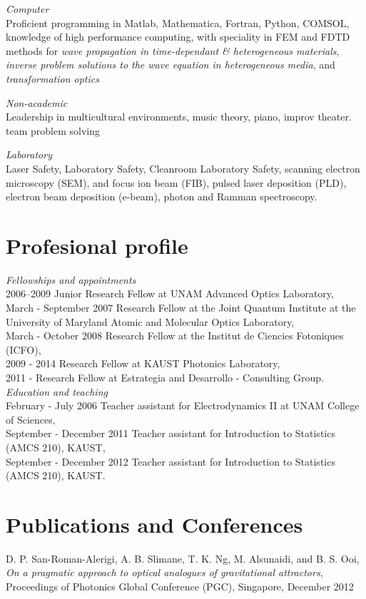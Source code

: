 \documentclass[margin]{res}
\begin{document}
\emph{Computer }\\
 Proficient programming in Matlab, Mathematica, Fortran, Python, COMSOL, knowledge of high performance computing, with speciality in FEM and FDTD methods for \emph{wave propagation in time-dependant \& heterogeneous materials},  \emph{inverse problem solutions to the wave equation in heterogeneous media}, and \emph{transformation optics} 

\emph{Non-academic}\\
Leadership  in multicultural environments,  music theory, piano, improv theater. team problem solving

\emph{Laboratory}\\
 Laser Safety, Laboratory Safety, Cleanroom Laboratory Safety, scanning electron microscopy (SEM), and focus ion beam (FIB), pulsed laser deposition (PLD), electron beam deposition (e-beam), photon and Ramman spectroscopy.\\


\section{Profesional profile}

\emph{Fellowships and appointments}\\
2006--2009 Junior Research Fellow at UNAM Advanced Optics Laboratory,\\ 
March - September 2007 Research Fellow at the Joint Quantum Institute at the University of Maryland Atomic and Molecular Optics Laboratory,\\
March - October 2008 Research Fellow at the Institut de Ciencies Fotoniques (ICFO),\\
2009 - 2014 Research Fellow at KAUST Photonics Laboratory,\\
2011 -  Research Fellow at Estrategia and Desarrollo - Consulting Group.\\

\emph{Education and teaching}\\
February - July 2006 Teacher assistant for Electrodynamics II at UNAM College of Sciences,\\
September - December 2011 Teacher assistant for Introduction to Statistics  (AMCS 210), KAUST,\\
September - December 2012 Teacher assistant for Introduction to Statistics  (AMCS 210), KAUST.\\



\section{Publications and Conferences}
D. P. San-Roman-Alerigi, A. B. Slimane, T. K. Ng, M. Alsunaidi, and B. S. Ooi, \emph{On a pragmatic approach to optical analogues of gravitational attractors}, Proceedings of Photonics Global Conference (PGC), Singapore, December 2012
\end{document}
